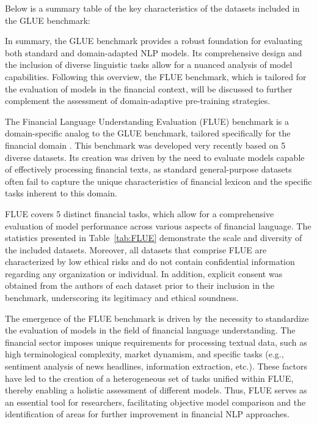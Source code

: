 Below is a summary table of the key characteristics of the datasets included in the GLUE benchmark:



In summary, the GLUE benchmark provides a robust foundation for evaluating both standard and domain-adapted NLP models.
Its comprehensive design and the inclusion of diverse linguistic tasks allow for a nuanced analysis of model capabilities.
Following this overview, the FLUE benchmark, which is tailored for the evaluation of models in the financial context,
will be discussed to further complement the assessment of domain-adaptive pre-training strategies.

The Financial Language Understanding Evaluation (FLUE) benchmark is a domain-specific analog to the GLUE benchmark,
tailored specifically for the financial domain \parencite{FLANG2022FLUE}. This benchmark was developed very recently based
on 5 diverse datasets. Its creation was driven by the need to evaluate models capable of effectively processing
financial texts, as standard general-purpose datasets often fail to capture the unique characteristics of financial
lexicon and the specific tasks inherent to this domain.



FLUE covers 5 distinct financial tasks, which allow for a comprehensive evaluation of model performance across various aspects
of financial language. The statistics presented in Table~\ref{tab:FLUE} demonstrate the scale and diversity of the included datasets.
Moreover, all datasets that comprise FLUE are characterized by low ethical risks and do not contain confidential information regarding
any organization or individual. In addition, explicit consent was obtained from the authors of each dataset prior to their inclusion
in the benchmark, underscoring its legitimacy and ethical soundness.

The emergence of the FLUE benchmark is driven by the necessity to standardize the evaluation of models in the field of financial
language understanding. The financial sector imposes unique requirements for processing textual data, such as high terminological
complexity, market dynamism, and specific tasks (e.g., sentiment analysis of news headlines, information extraction, etc.). These
factors have led to the creation of a heterogeneous set of tasks unified within FLUE, thereby enabling a holistic assessment
of different models. Thus, FLUE serves as an essential tool for researchers, facilitating objective model comparison
and the identification of areas for further improvement in financial NLP approaches.